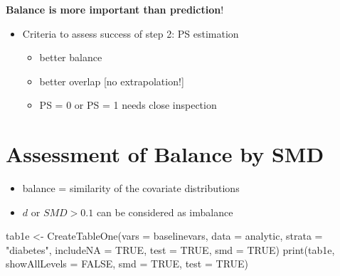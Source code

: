 \documentclass[
]{book}
\newenvironment{Shaded}{\begin{snugshade}}{\end{snugshade}}
\newcommand{\AttributeTok}[1]{\textcolor[rgb]{0.77,0.63,0.00}{#1}}
\newcommand{\ConstantTok}[1]{\textcolor[rgb]{0.00,0.00,0.00}{#1}}
\newcommand{\FunctionTok}[1]{\textcolor[rgb]{0.00,0.00,0.00}{#1}}
\newcommand{\NormalTok}[1]{#1}
\newcommand{\OtherTok}[1]{\textcolor[rgb]{0.56,0.35,0.01}{#1}}
\newcommand{\StringTok}[1]{\textcolor[rgb]{0.31,0.60,0.02}{#1}}
\providecommand{\tightlist}{%
  \setlength{\itemsep}{0pt}\setlength{\parskip}{0pt}}
\begin{document}
\textbf{Balance is more important than prediction}!

\begin{itemize}
\tightlist
\item
  Criteria to assess success of step 2: PS estimation

  \begin{itemize}
  \tightlist
  \item
    better balance
  \item
    better overlap {[}no extrapolation!{]}
  \item
    PS = 0 or PS = 1 needs close inspection
  \end{itemize}
\end{itemize}

\hypertarget{assessment-of-balance-by-smd}{%
\section{Assessment of Balance by SMD}\label{assessment-of-balance-by-smd}}

\begin{itemize}
\tightlist
\item
  balance = similarity of the covariate distributions
\item
  \(d\) or \(SMD > 0.1\) can be considered as imbalance \citep{austin2011introduction}
\end{itemize}

\begin{Shaded}
\begin{Highlighting}[]
\NormalTok{tab1e }\OtherTok{\textless{}{-}} \FunctionTok{CreateTableOne}\NormalTok{(}\AttributeTok{vars =}\NormalTok{ baselinevars,}
                        \AttributeTok{data =}\NormalTok{ analytic, }
                        \AttributeTok{strata =} \StringTok{"diabetes"}\NormalTok{,}
                        \AttributeTok{includeNA =} \ConstantTok{TRUE}\NormalTok{,}
                        \AttributeTok{test =} \ConstantTok{TRUE}\NormalTok{, }\AttributeTok{smd =} \ConstantTok{TRUE}\NormalTok{)}
\FunctionTok{print}\NormalTok{(tab1e, }\AttributeTok{showAllLevels =} \ConstantTok{FALSE}\NormalTok{, }\AttributeTok{smd =} \ConstantTok{TRUE}\NormalTok{, }\AttributeTok{test =} \ConstantTok{TRUE}\NormalTok{)}
\end{Highlighting}
\end{Shaded}
\end{document}
